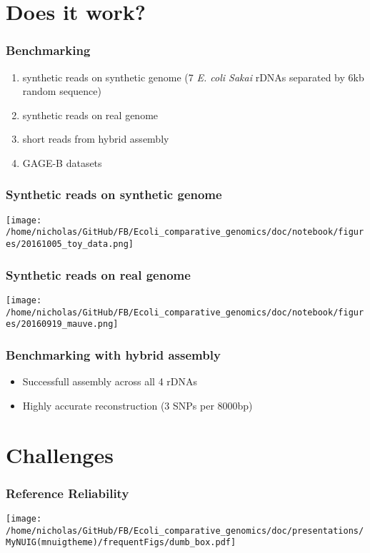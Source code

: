 \documentclass[10pt, compress]{beamer}
\begin{document}
\section{Does it work?}

\begin{frame}[fragile]
  \frametitle{Benchmarking}
  \begin{enumerate}
  \item synthetic reads on synthetic genome (7 \textit{E. coli Sakai} rDNAs separated by 6kb random sequence)
  \item synthetic reads on real genome
  \item short reads from hybrid assembly
  \item GAGE-B datasets
  \end{enumerate}

\end{frame}

\begin{frame}[fragile]
  \frametitle{Synthetic reads on synthetic genome}
  \hspace*{-0cm}
  \texttt{[image: /home/nicholas/GitHub/FB/Ecoli\_comparative\_genomics/doc/notebook/figures/20161005\_toy\_data.png]}
\end{frame}

\begin{frame}[fragile]
  \frametitle{Synthetic reads on real genome}
  \hspace*{-0cm}
  \texttt{[image: /home/nicholas/GitHub/FB/Ecoli\_comparative\_genomics/doc/notebook/figures/20160919\_mauve.png]}
\end{frame}

\begin{frame}[fragile]
  \frametitle{Benchmarking with hybrid assembly}
  \begin{itemize}
  \item Successfull assembly across all 4 rDNAs
  \item Highly accurate reconstruction (3 SNPs per 8000bp)
  \end{itemize}
\end{frame}

\section{Challenges}
\begin{frame}[fragile]
  \frametitle{Reference Reliability}
  \hspace*{-0cm}
  \texttt{[image: /home/nicholas/GitHub/FB/Ecoli\_comparative\_genomics/doc/presentations/MyNUIG(mnuigtheme)/frequentFigs/dumb\_box.pdf]}
\end{frame}
\end{document}
